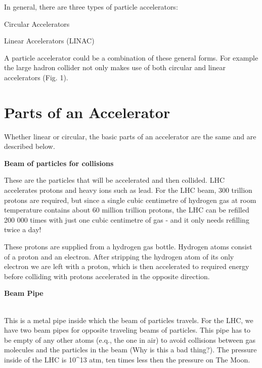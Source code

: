 \;

In general, there are three types of particle accelerators: 

\;

           \cdot \:  Circular Accelerators

	   \cdot \:  Linear Accelerators (LINAC)

\;
\noindent
A particle accelerator could be a combination of these general forms. For example the large hadron collider not only makes use of both circular and linear accelerators (Fig. 1).

\section{Parts of an Accelerator}

Whether linear or circular, the basic parts of an accelerator are the same and are described below.

\;


\noindent
\textbf{Beam of particles for collisions}

\;
\;

\noindent
These are the particles that will be accelerated and then collided. LHC accelerates protons and heavy ions such as lead. For the LHC beam, 300 trillion protons are required, but since a single cubic centimetre of hydrogen gas at room temperature contains about 60 million trillion protons, the LHC can be refilled 200 000 times with just one cubic centimetre of gas - and it only needs refilling twice a day!

\;
\noindent
These protons are supplied from a hydrogen gas bottle. Hydrogen atoms consist of a proton and an electron. After stripping the hydrogen atom of its only electron we are left with a proton, which is then accelerated to required energy before colliding with protons accelerated in the opposite direction.

\;

\noindent
\textbf{Beam Pipe}

\\
\noindent 
This is a metal pipe inside which the beam of particles travels. For the LHC, we have two beam pipes for opposite traveling beams of particles. This pipe has to be empty of any other atoms (e.q., the one in air) to avoid collisions between gas molecules and the particles in the beam (Why is this a bad thing?). The pressure inside of the LHC is 10^{13} atm, ten times less then the pressure on The Moon.

\;

